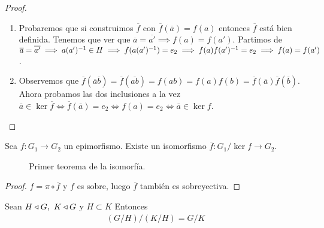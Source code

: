 \begin{proof} $ $\newline
	\begin{enumerate}
		\item Probaremos que si construimos $\overline{f}$ con $\overline{f}(\overline{a}) = f(a)$ entonces $\overline{f}$ está bien definida. Tenemos que ver que $\overline{a} = \overline{a'} \implies f(a) = f(a')$. Partimos de $\overline{a} = \overline{a'} \implies a (a')^{-1} \in H \implies f(a (a')^{-1}) = e_2 \implies f(a) f(a')^{-1} = e_2 \implies f(a) = f(a')$.
		
		\item Observemos que $\overline{f}(\overline{a}\overline{b}) = \overline{f}(\overline{ab}) = f(ab) = f(a)f(b)=\overline{f}(\overline{a})\overline{f}(\overline{b})$. Ahora probamos las dos inclusiones a la vez $\overline{a} \in \ker \overline{f} \iff \overline{f}(\overline{a}) = e_2 \iff f(a) = e_2 \iff \overline{a} \in \ker f$.
	\end{enumerate}
\end{proof}

\begin{thm}
	Sea $f:G_1 \to G_2$ un epimorfismo. Existe un isomorfismo $\overline{f}: G_1 / \ker f \to G_2$.
\end{thm}

\begin{figure}[h]
	\centering
	\caption{Primer teorema de la isomorfía.}
	\label{fig:tmisomorfia3}
\end{figure}

\begin{proof}
	$f = \pi \circ \overline{f}$ y $f$ es sobre, luego $\overline{f}$ también es sobreyectiva.
	
\end{proof}

\begin{thm}
	
	Sean $H \mathbin{\triangleleft} G,\ K \mathbin{\triangleleft} G$ y $H \subset K$ Entonces
	\begin{align}
		(G/H)/(K/H) = G/K
	\end{align}
\end{thm}

